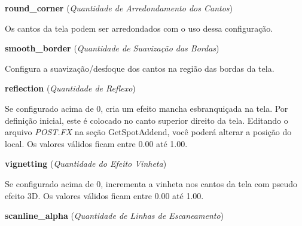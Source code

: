 \documentclass[letterpaper,10pt,brazil]{sphinxmanual}
\begin{document}
\begin{DUlineblock}{0em}
\item[] \textbf{round\_corner} (\emph{Quantidade de Arredondamento dos Cantos})
\item[] 
\item[]
\begin{DUlineblock}{\DUlineblockindent}
\item[] Os cantos da tela podem ser arredondados com o uso dessa configuração.
\item[] 
\end{DUlineblock}
\item[] \textbf{smooth\_border} (\emph{Quantidade de Suavização das Bordas})
\item[] 
\item[]
\begin{DUlineblock}{\DUlineblockindent}
\item[] Configura a suavização/desfoque dos cantos na região das bordas da tela.
\item[] 
\end{DUlineblock}
\item[] \textbf{reflection} (\emph{Quantidade de Reflexo})
\item[] 
\item[]
\begin{DUlineblock}{\DUlineblockindent}
\item[] Se configurado acima de 0, cria um efeito mancha esbranquiçada na tela. Por definição inicial, este é colocado no canto superior direito da tela. Editando o arquivo \emph{POST.FX} na seção GetSpotAddend, você poderá alterar a posição do local. Os valores válidos ficam entre 0.00 até 1.00.
\item[] 
\end{DUlineblock}
\item[] \textbf{vignetting} (\emph{Quantidade do Efeito Vinheta})
\item[] 
\item[]
\begin{DUlineblock}{\DUlineblockindent}
\item[] Se configurado acima de 0, incrementa a vinheta nos cantos da tela com pseudo efeito 3D. Os valores válidos ficam entre 0.00 até 1.00.
\item[] 
\end{DUlineblock}
\item[] \textbf{scanline\_alpha} (\emph{Quantidade de Linhas de Escaneamento})
\item[] 
\item[]
\begin{DUlineblock}{\DUlineblockindent}

\end{DUlineblock}
\end{DUlineblock}
\end{document}
